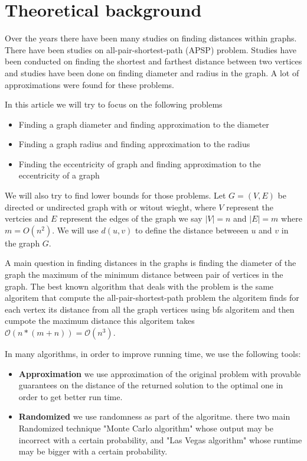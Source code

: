\section{Theoretical background}

Over the years there have been many studies on ﬁnding distances within graphs. There have been studies on all-pair-shortest-path (APSP) problem. Studies have been conducted on ﬁnding the shortest and farthest distance between two vertices and studies have been done on ﬁnding diameter and radius in the graph.
A lot of approximations were found for these problems.

\newline In this article we will try to focus on the following problems
\begin{itemize}
    \item Finding a graph diameter and finding approximation to the diameter
    \item Finding a graph radius and finding approximation to the radius
    \item Finding the eccentricity of graph and finding approximation to the eccentricity of a graph
\end{itemize}
We will also try to find lower bounds for those problems.
\newline\newline Let $G=(V,E)$ be directed or undirected graph with or witout wieght, where $V$ represent the vertcies and $E$ represent the edges of the graph we say $|V|=n$ and $|E|=m$ where $m =O(n^2)$.
We will use $d(u,v)$ to define the distance betweeen $u$ and $v$ in the graph $G$.

A main question in finding distances in the graphs is finding the diameter of the graph the maximum of the minimum distance between pair of vertices in the graph. The best known algorithm that deals with the problem is the same algoritem that compute the all-pair-shortest-path problem the algoritem finds for each vertex its distance from all the graph vertices using bfs algoritem and then cumpote the maximum distance this algoritem takes $\mathcal{O}(n*(m+n))=\mathcal{O}(n^3)$.

In many algorithms, in order to improve running time, we use the following tools:
\begin{itemize}
    \item \textbf{Approximation} we use approximation of the original problem with provable guarantees on the distance of the returned solution to the optimal one in order to get better run time.
    \item  \textbf{Randomized} we use randomness as part of the algoritme. there two main Randomized technique "Monte Carlo algorithm" whose output may be incorrect with a certain probability, and "Las Vegas algorithm" whose runtime may be bigger with a certain probability.
\end{itemize}

